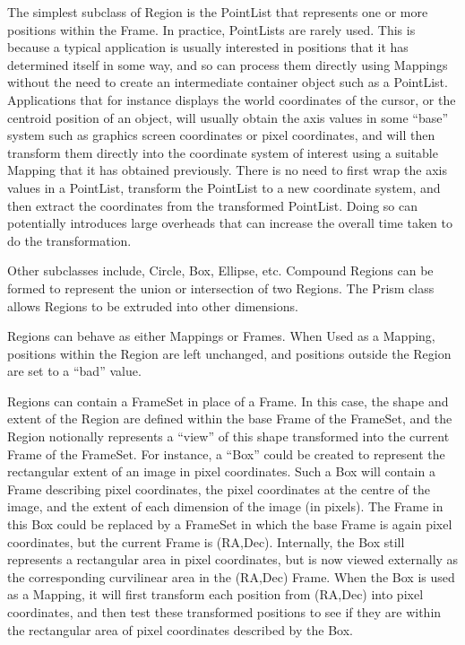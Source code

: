 \documentclass[final,authoryear,5p,times,twocolumn]{elsarticle}
\begin{document}
The simplest subclass of Region is the PointList that represents one
or more positions within the Frame.  In practice, PointLists are
rarely used. This is because a typical application is usually
interested in positions that it has determined itself in some way, and
so can process them directly using Mappings without the need to create
an intermediate container object such as a PointList. Applications
that for instance displays the world coordinates of the cursor, or the
centroid position of an object, will usually obtain the axis values in
some ``base'' system such as graphics screen coordinates or pixel
coordinates, and will then transform them directly into the coordinate
system of interest using a suitable Mapping that it has obtained
previously. There is no need to first wrap the axis values in a
PointList, transform the PointList to a new coordinate system, and
then extract the coordinates from the transformed PointList. Doing so
can potentially introduces large overheads that can increase the
overall time taken to do the transformation.

Other subclasses include, Circle, Box, Ellipse, etc. Compound Regions
can be formed to represent the union or intersection of two
Regions. The Prism class allows Regions to be extruded into other
dimensions.

Regions can behave as either Mappings or Frames. When Used as a
Mapping, positions within the Region are left unchanged, and positions
outside the Region are set to a ``bad'' value.

Regions can contain a FrameSet in place of a Frame. In this case, the
shape and extent of the Region are defined within the base Frame of
the FrameSet, and the Region notionally represents a ``view'' of this
shape transformed into the current Frame of the FrameSet. For
instance, a ``Box'' could be created to represent the rectangular extent
of an image in pixel coordinates. Such a Box will contain a Frame
describing pixel coordinates, the pixel coordinates at the centre of
the image, and the extent of each dimension of the image (in
pixels). The Frame in this Box could be replaced by a FrameSet in
which the base Frame is again pixel coordinates, but the current Frame
is (RA,Dec). Internally, the Box still represents a rectangular area
in pixel coordinates, but is now viewed externally as the
corresponding curvilinear area in the (RA,Dec) Frame. When the Box is
used as a Mapping, it will first transform each position from (RA,Dec)
into pixel coordinates, and then test these transformed positions to
see if they are within the rectangular area of pixel coordinates
described by the Box.
\end{document}
